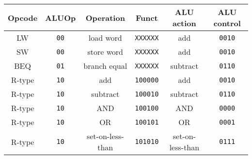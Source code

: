 \centering
\begin{tabular}[t]{cccccc}
    \toprule
    Opcode & ALUOp       & Operation        & Funct           & ALU action       & ALU control   \\
    \midrule
    LW     & \texttt{00} & load word        & \texttt{XXXXXX} & add              & \texttt{0010} \\
    SW     & \texttt{00} & store word       & \texttt{XXXXXX} & add              & \texttt{0010} \\
    BEQ    & \texttt{01} & branch equal     & \texttt{XXXXXX} & subtract         & \texttt{0110} \\
    R-type & \texttt{10} & add              & \texttt{100000} & add              & \texttt{0010} \\
    R-type & \texttt{10} & subtract         & \texttt{100010} & subtract         & \texttt{0110} \\
    R-type & \texttt{10} & AND              & \texttt{100100} & AND              & \texttt{0000} \\
    R-type & \texttt{10} & OR               & \texttt{100101} & OR               & \texttt{0001} \\
    R-type & \texttt{10} & set-on-less-than & \texttt{101010} & set-on-less-than & \texttt{0111} \\
    \bottomrule
\end{tabular}
